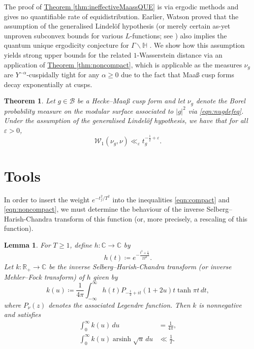 \documentclass[11pt,a4paper]{amsart}
\newcommand{\BB}{\mathcal{B}}
\newcommand{\C}{\mathbb{C}}
\newcommand{\e}{\varepsilon}
\newcommand{\Hb}{\mathbb{H}}
\newcommand{\R}{\mathbb{R}}
\newcommand{\Wscr}{\mathscr{W}}
\DeclareMathOperator{\arsinh}{arsinh}
\numberwithin{equation}{section}
\newtheorem{theorem}[equation]{Theorem}
\newtheorem{lemma}[equation]{Lemma}
\theoremstyle{remark}
\theoremstyle{definition}
\begin{document}
The proof of \hyperref[thm:ineffectiveMaassQUE]{Theorem \ref*{thm:ineffectiveMaassQUE}} is via ergodic methods and gives no quantifiable rate of equidistribution. Earlier, Watson proved that the assumption of the generalised Lindel\"{o}f hypothesis (or merely certain as-yet unproven subconvex bounds for various $L$-functions; see \cite{BHMWW24,Nel25}) also implies the quantum unique ergodicity conjecture for $\Gamma \backslash \Hb$ \cite[Corollary 1]{Wat08}. We show how this assumption yields strong upper bounds for the related $1$-Wasserstein distance via an application of \hyperref[thm:noncompact]{Theorem \ref*{thm:noncompact}}, which is applicable as the measures $\nu_g$ are $Y^{-\alpha}$-cuspidally tight for any $\alpha \geq 0$ due to the fact that Maa\ss{} cusp forms decay exponentially at cusps.

\begin{theorem}
\label{thm:MaassQUE}
Let $g \in \BB$ be a Hecke--Maa\ss{} cusp form and let $\nu_g$ denote the Borel probability measure on the modular surface associated to $|g|^2$ via \eqref{eqn:nugdefeq}. Under the assumption of the generalised Lindel\"{o}f hypothesis, we have that for all $\e > 0$,
\[\Wscr_1(\nu_g,\nu) \ll_{\e} t_g^{-\frac{1}{2} + \e}.\]
\end{theorem}


\section{Tools}

In order to insert the weight $e^{-t_f^2/T^2}$ into the inequalities \eqref{eqn:compact} and \eqref{eqn:noncompact}, we must determine the behaviour of the inverse Selberg--Harish-Chandra transform of this function (or, more precisely, a rescaling of this function).

\begin{lemma}
For $T \geq 1$, define $h : \C \to \C$ by
\begin{equation}
\label{eqn:hdefeq}
h(t) \coloneqq e^{-\frac{t^2 + \frac{1}{4}}{2T^2}}.
\end{equation}
Let $k : \R_+ \to \C$ be the inverse Selberg--Harish-Chandra transform (or inverse Mehler--Fock transform) of $h$ given by
\begin{equation}
\label{eqn:kdefeq}
k(u) \coloneqq \frac{1}{4\pi} \int_{-\infty}^{\infty} h(t) P_{-\frac{1}{2} + it}(1 + 2u) t \tanh \pi t \, dt,
\end{equation}
where $P_{\nu}(z)$ denotes the associated Legendre function. Then $k$ is nonnegative and satisfies
\begin{align}
\label{eqn:kint}
\int_{0}^{\infty} k(u) \, du & = \frac{1}{4\pi},	\\
\label{eqn:karsinhint}
\int_{0}^{\infty} k(u) \arsinh \sqrt{u} \, du & \ll \frac{1}{T}.
\end{align}
\end{lemma}
\end{document}
